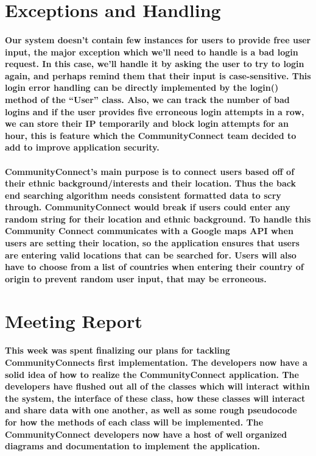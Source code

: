 \documentclass[12pt]{article}
\begin{document}
\section{\bf Exceptions and Handling}
  \paragraph{\normalfont \indent Our system doesn’t contain few instances for users to provide free user input, the major exception which we’ll need to handle is a bad login request. In this case, we’ll handle it by asking the user to try to login again, and perhaps remind them that their input is case-sensitive. This login error handling can be directly implemented by the login() method of the “User” class. Also, we can track the number of bad logins and if the user provides five erroneous login attempts in a row, we can store their IP temporarily and block login attempts for an hour, this is feature which the CommunityConnect team decided to add to improve application security.
  }
  \paragraph{\normalfont \indent CommunityConnect’s main purpose is to connect users based off of their ethnic background/interests and their location. Thus the back end searching algorithm needs consistent formatted data to scry through. CommunityConnect would break if users could enter any random string for their location and ethnic background. To handle this Community Connect communicates with a Google maps API when users are setting their location, so the application ensures that users are entering valid locations that can be searched for. Users will also have to choose from a list of countries when entering their country of origin to prevent random user input, that may be erroneous.
  }

\section{\bf Meeting Report}
  \paragraph{\normalfont \indent This week was spent finalizing our plans for tackling CommunityConnects first implementation. The developers now have a solid idea of how to realize the CommunityConnect application. The developers have flushed out all of the classes which will interact within the system, the interface of these class, how these classes will interact and share data with one another, as well as some rough pseudocode for how the methods of each class will be implemented. The CommunityConnect developers now have a host of well organized diagrams and documentation to implement the application.
  }
\end{document}
